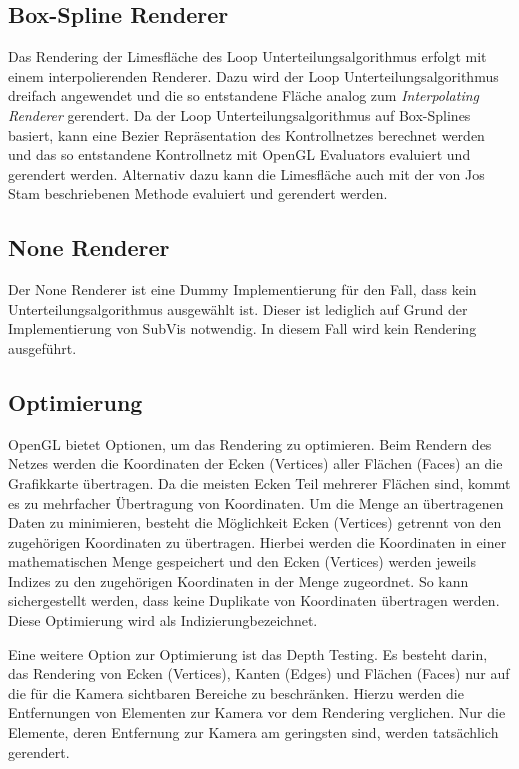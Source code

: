 \subsection{Box-Spline Renderer}
Das Rendering der Limesfläche des Loop Unterteilungsalgorithmus erfolgt mit einem interpolierenden Renderer.
Dazu wird der Loop Unterteilungsalgorithmus dreifach angewendet und die so entstandene Fläche analog zum \textit{Interpolating Renderer} gerendert.
Da der Loop Unterteilungsalgorithmus auf Box-Splines basiert, kann eine Bezier Repräsentation des Kontrollnetzes berechnet werden \cite{prautzsch:2002} und das so entstandene Kontrollnetz mit OpenGL Evaluators evaluiert und gerendert werden.
Alternativ dazu kann die Limesfläche auch mit der von Jos Stam beschriebenen Methode \cite{JosStam.24.07.2015} evaluiert und gerendert werden.

\subsection{None Renderer}
Der None Renderer ist eine Dummy Implementierung für den Fall, dass kein Unterteilungsalgorithmus ausgewählt ist.
Dieser ist lediglich auf Grund der Implementierung von SubVis notwendig. In diesem Fall wird kein Rendering ausgeführt.

\subsection{Optimierung}
OpenGL bietet Optionen, um das Rendering zu optimieren.
Beim Rendern des Netzes werden die Koordinaten der Ecken (Vertices) aller Flächen (Faces) an die Grafikkarte übertragen.
Da die meisten Ecken Teil mehrerer Flächen sind, kommt es zu mehrfacher Übertragung von Koordinaten.
Um die Menge an übertragenen Daten zu minimieren, besteht die Möglichkeit Ecken (Vertices) getrennt von den zugehörigen Koordinaten zu übertragen.
Hierbei werden die Koordinaten in einer mathematischen Menge gespeichert und den Ecken (Vertices) werden jeweils Indizes zu den zugehörigen Koordinaten in der Menge zugeordnet.
So kann sichergestellt werden, dass keine Duplikate von Koordinaten übertragen werden.
Diese Optimierung wird als \glqq Indizierung\grqq bezeichnet.

Eine weitere Option zur Optimierung ist das \glqq Depth Testing\grqq.
Es besteht darin, das Rendering von Ecken (Vertices), Kanten (Edges) und Flächen (Faces) nur auf die für die Kamera sichtbaren Bereiche zu beschränken.
Hierzu werden die Entfernungen von Elementen zur Kamera vor dem Rendering verglichen.
Nur die Elemente, deren Entfernung zur Kamera am geringsten sind, werden tatsächlich gerendert.

